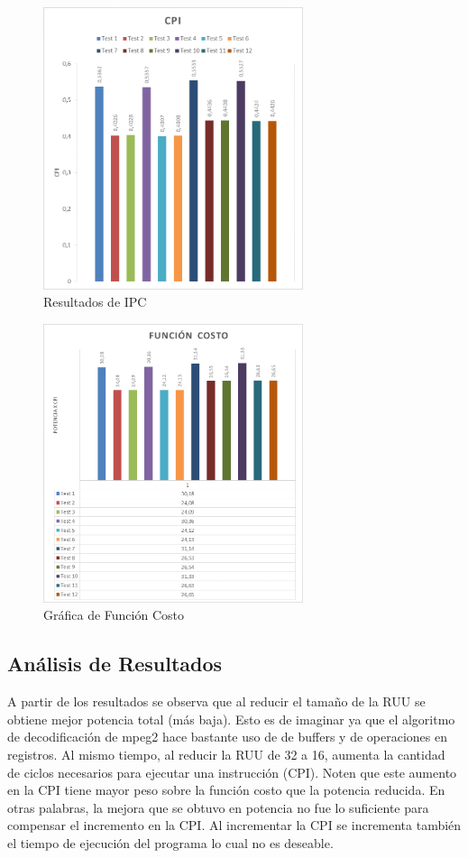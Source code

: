 \documentclass[journal]{IEEEtran}
\begin{document}
\begin{figure}[!ht]
        \begin{center}
        \includegraphics[width=3in]{fig2.png}
        \caption{Resultados de IPC}
        \end{center}
\end{figure}

\begin{figure}[!ht]
        \begin{center}
        \includegraphics[width=3in]{fig3.png}
        \caption{Gr\'{a}fica de Funci\'{o}n Costo}
        \end{center}
\end{figure}

\subsection{An\'{a}lisis de Resultados}
A partir de los resultados se observa que al reducir el tama\~{n}o de la RUU se obtiene mejor potencia total (m\'{a}s baja). Esto es de imaginar ya que el algoritmo de decodificaci\'{o}n de mpeg2 hace bastante uso de de buffers y de operaciones en registros. Al mismo tiempo, al reducir la RUU de 32 a 16, aumenta la cantidad de ciclos necesarios para ejecutar una instrucci\'{o}n (CPI). Noten que este aumento en la CPI
tiene mayor peso sobre la funci\'{o}n costo que la potencia reducida. En otras palabras, la mejora que se obtuvo en potencia no fue lo suficiente para compensar el incremento en la CPI. Al incrementar la CPI se incrementa tambi\'{e}n
el tiempo de ejecuci\'{o}n del programa lo cual no es deseable.
\end{document}
